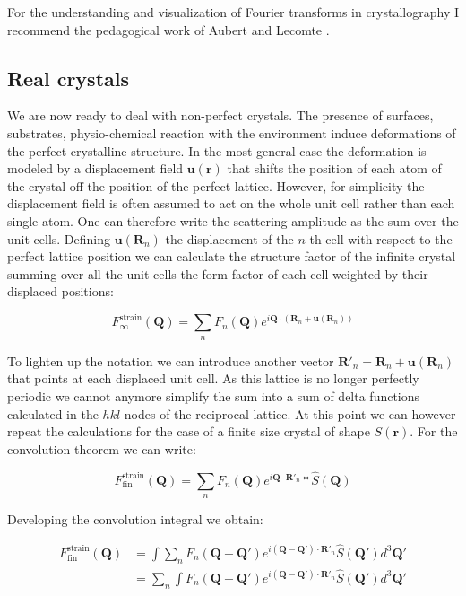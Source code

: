 For the understanding and visualization of Fourier transforms in crystallography I recommend the pedagogical work of 
Aubert and Lecomte \cite{Aubert:kk5014}.

\subsection{Real crystals}
We are now ready to deal with non-perfect crystals. The presence of surfaces, substrates, physio-chemical reaction with 
the environment induce deformations of the perfect crystalline structure. In the most general case the deformation is 
modeled by a displacement field $\mathbf{u(r)}$ 
that shifts the position of each atom of the crystal off the position of the perfect lattice. However, for simplicity 
the displacement field is often assumed to act on the whole unit cell rather than each single atom. One can therefore 
write the scattering amplitude as the sum over the unit cells. 
Defining $\mathbf{u}(\mathbf{R}_n)$ the displacement of the $n$-th cell with respect to the perfect lattice position 
we can calculate the structure factor of the infinite crystal summing over all the unit cells the form factor of each cell weighted by 
their displaced positions: 

\begin{equation}
    F^{\text{strain}}_{\infty}(\mathbf{Q}) = 
    \sum_{n} F_n(\mathbf{Q}) e^{i \mathbf{Q} \cdot (\mathbf{R}_n + \mathbf{u}(\mathbf{R}_n))}
   \label{eq:strain1}
\end{equation} 

To lighten up the notation we can introduce another vector $\mathbf{R}'_n = \mathbf{R}_n + \mathbf{u}(\mathbf{R}_n)$ that 
points at each displaced unit cell. As this lattice is no longer perfectly periodic we cannot anymore simplify the sum 
into a sum of delta functions calculated in the $hkl$ nodes of the reciprocal lattice. 
At this point we can however repeat the calculations for the case of a finite size crystal of shape $S(\mathbf{r})$. 
For the convolution theorem we can write: 

\begin{equation}
    F^{\text{strain}}_{\text{fin}}(\mathbf{Q}) = 
    \sum_{n} F_n(\mathbf{Q}) e^{i \mathbf{Q} \cdot \mathbf{R}'_n} \ast \widehat{S}(\mathbf{Q})
   \label{eq:strain_fin}
\end{equation}

Developing the convolution integral we obtain: 

\begin{equation}
    \begin{aligned}
    F^{\text{strain}}_{\text{fin}}(\mathbf{Q}) &= 
    \int \sum_{n} F_n(\mathbf{Q} -\mathbf{Q'}) e^{i (\mathbf{Q}-\mathbf{Q'}) \cdot \mathbf{R}'_n} \widehat{S}(\mathbf{Q'})d^3\mathbf{Q'} \\
    &= \sum_{n} \int F_n(\mathbf{Q} -\mathbf{Q'}) e^{i (\mathbf{Q}-\mathbf{Q'}) \cdot \mathbf{R}'_n} \widehat{S}(\mathbf{Q'})d^3\mathbf{Q'} \\ 
   \label{eq:strain_fin2}
    \end{aligned}
\end{equation}

